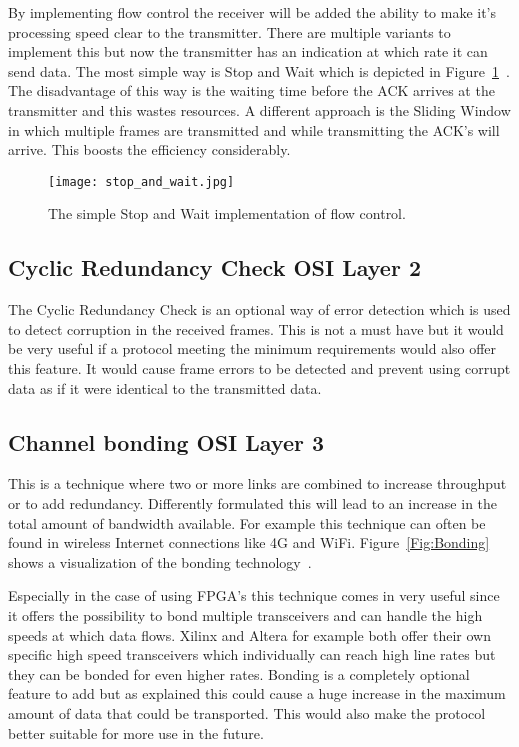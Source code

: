 By implementing flow control the receiver will be added the ability to make it's processing speed clear to the transmitter. There are multiple variants to implement this but now the transmitter has an indication at which rate it can send data. The most simple way is Stop and Wait which is depicted in Figure~\ref{fig:Flow_Control}~\cite{FlowControl}. The disadvantage of this way is the waiting time before the ACK arrives at the transmitter and this wastes resources. A different approach is the Sliding Window in which multiple frames are transmitted and while transmitting the ACK's will arrive. This boosts the efficiency considerably. \\

\begin{figure}[H]
	\centering
	\texttt{[image: stop\_and\_wait.jpg]}	
	\caption{The simple Stop and Wait implementation of flow control.}
	\label{fig:Flow_Control}
\end{figure} 

\subsection[Cyclic Redundancy Check]{Cyclic Redundancy Check \hfill OSI Layer 2}
The Cyclic Redundancy Check is an optional way of error detection which is used to detect corruption in the received frames. This is not a must have but it would be very useful if a protocol meeting the minimum requirements would also offer this feature. It would cause frame errors to be detected and prevent using corrupt data as if it were identical to the transmitted data.


\subsection[Channel bonding]{Channel bonding \hfill OSI Layer 3}
This is a technique where two or more links are combined to increase throughput or to add redundancy. Differently formulated this will lead to an increase in the total amount of bandwidth available. For example this technique can often be found in wireless Internet connections like 4G and WiFi. Figure~\ref{Fig:Bonding} shows a visualization of the bonding technology~\cite{Bonding_Image}.

Especially in the case of using FPGA's this technique comes in very useful since it offers the possibility to bond multiple transceivers and can handle the high speeds at which data flows. Xilinx and Altera for example both offer their own specific high speed transceivers which individually can reach high line rates but they can be bonded for even higher rates. Bonding is a completely optional feature to add but as explained this could cause a huge increase in the maximum amount of data that could be transported. This would also make the protocol better suitable for more use in the future.

